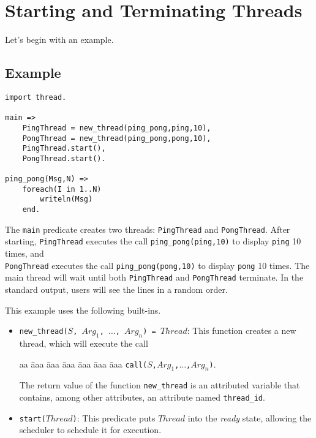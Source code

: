 \section{Starting and Terminating Threads}
Let's begin with an example.

\subsection*{Example}
\begin{verbatim}
import thread.

main =>
    PingThread = new_thread(ping_pong,ping,10),
    PongThread = new_thread(ping_pong,pong,10),
    PingThread.start(),
    PongThread.start().

ping_pong(Msg,N) =>
    foreach(I in 1..N)
        writeln(Msg)
    end.
\end{verbatim}
The \texttt{main} predicate creates two threads: \texttt{PingThread} and \texttt{PongThread}. After starting, \texttt{PingThread} executes the call \texttt{ping\_pong(ping,10)} to display \texttt{ping} 10 times, and \\ \texttt{PongThread} executes the call \texttt{ping\_pong(pong,10)} to display \texttt{pong} 10 times. The main thread will wait until both \texttt{PingThread} and \texttt{PongThread} terminate. In the standard output, users will see the lines in a random order.

This example uses the following built-ins. 
\begin{itemize}
\item \texttt{new\_thread($S$, $Arg_1$, $\ldots$, $Arg_n$) = $Thread$}: This function creates a new thread, which will execute the call 
\begin{tabbing}
aa \= aaa \= aaa \= aaa \= aaa \= aaa \= aaa \kill
\> \texttt{call($S$,$Arg_1$,$\ldots$,$Arg_n$)}. 
\end{tabbing}
The return value of the function \texttt{new\_thread} is an attributed variable that contains, among other attributes, an attribute named \texttt{thread\_id}. 
\item \texttt{start($Thread$)}: This predicate puts $Thread$ into the \emph{ready} state, allowing the scheduler to schedule it for execution.
\end{itemize}

